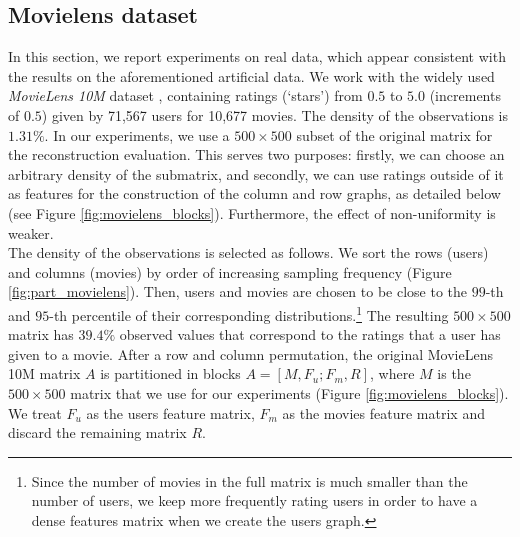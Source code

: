 \documentclass{article}
\begin{document}
\vspace{-0.15cm}
\subsection{Movielens dataset}
\label{secNumExp}
\vspace{-0.25cm}
In this section, we report experiments on real data, which appear consistent with the results on the aforementioned artificial data. We work with the widely used \textit{MovieLens 10M} dataset \cite{pro:Miller03MovieLens}, containing ratings (`stars') from $0.5$ to $5.0$ (increments of $0.5$) given by 71,567 users for 10,677 movies. The density of the observations is $1.31\%$. In our experiments, we use a $500\times 500$ subset of the original matrix for the reconstruction evaluation. This serves two purposes: firstly, we can choose an arbitrary density of the submatrix, and secondly, we can use ratings outside of it as features for the construction of the column and row graphs, as detailed below (see Figure \ref{fig:movielens_blocks}). Furthermore, the effect of non-uniformity is weaker.\\
The density of the observations is selected as follows. We sort the rows (users) and columns (movies) by order of increasing sampling frequency (Figure \ref{fig:part_movielens}). Then, users and movies are chosen to be close to the $99$-th and $95$-th percentile of their corresponding distributions.\footnote{Since the number of movies in the full matrix is much smaller than the number of users, we keep more frequently rating users in order to have a dense features matrix when we create the users graph.} The resulting $500\times 500$ matrix has $39.4\%$ observed values  that correspond to the ratings that a user has given to a movie.
After a row and column permutation, the original MovieLens 10M matrix $A$ is partitioned in blocks $A = [M, F_u; F_m, R]$, where $M$ is the $500\times 500$ matrix that we use for our experiments (Figure \ref{fig:movielens_blocks}). We treat $F_u$ as the users feature matrix, $F_m$ as the movies feature matrix and discard the remaining matrix $R$.
\end{document}
